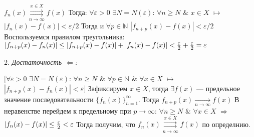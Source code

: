 \documentclass[a4paper,12pt]{article} %
\begin{document}
\noindent $f_n(x) \overset{x \in X}{\underset{n \rightarrow \infty}{\rightrightarrows}} f(x)$ 
\newline \newline
Тогда: \newline
\hspace*{5mm}$\forall \varepsilon > 0$ $\exists N = N(\varepsilon)$:
$\forall n \geq N$ $\&$ $x \in X$ $\longmapsto$ $|f_n(x) - f(x)| < \varepsilon / 2$ \newline
Тогда и 
\newline 
\hspace*{5mm}$\forall p \in \mathds{N}$ $|f_{n+p}(x) - f(x)| < \varepsilon / 2$
\newline \newline 
Воспользуемся правилом треугольника: \newline \newline
$|f_{n+p}(x) - f_n(x)| \leq |f_{n+p}(x) - f(x)| + |f_n(x) - f(x)| < {\varepsilon \over 2} + {\varepsilon \over 2} = \varepsilon$
\noindent  \newline \newline

2. \textit{Достаточность $\Leftarrow$:} \newline

\hspace*{5mm}$\big[\forall \varepsilon > 0 $  $\exists N = N(\varepsilon)$: $\forall n \geq N$  $\&$ $\forall p \in  \mathds{N}$ $\&$ $\forall x \in X$ $\longmapsto$ \newline 
\hspace*{50mm}$|f_{n+p}(x) -f_n(x)| < \varepsilon\big]$
\newline \newline 
Зафиксируем $x \in X$, тогда $\exists f(x)$ --- предельное значение последовательности $\{f_n(x)\}_{n=1}^\infty$. \newline \newline 
Тогда $f_{n+p}(x) \underset{n \longrightarrow \infty}{\longrightarrow} f(x)$ \newline \newline 
В неравенстве перейдем к предельному при $p \longrightarrow \infty$:\newline 
\hspace*{20mm}$\forall n \geq N$ $\&$ $\forall x \in X$ $\Rightarrow$ $|f_n(x) - f(x)| \leq {\varepsilon \over 2} < \varepsilon$  
\newline \newline 
Тогда получим, что $f_n(x) \overset{x \in X}{\underset{n \rightarrow \infty}{\rightrightarrows}} f(x)$ по определнию.
\newline \newline 
\end{document}
